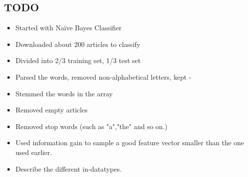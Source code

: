 	\subsection{TODO}
	\begin{itemize}
		\item Started with Naïve Bayes Classifier
		\item Downloaded about 200 articles to classify
		\item Divided into 2/3 training set, 1/3 test set
		\item Parsed the words, removed non-alphabetical letters, kept -
		\item Stemmed the words in the array
		\item Removed empty articles
		\item Removed stop words (such as "a","the" and so on.)
		\item Used information gain to sample a good feature vector smaller than the one used earlier.
		\item Describe the different in-datatypes.
	\end{itemize}
\fi
